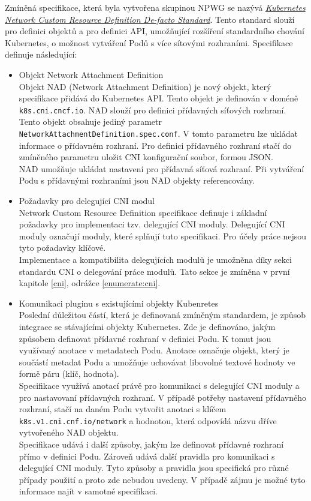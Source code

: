 Zmíněná specifikace, která byla vytvořena skupinou NPWG se nazývá \href{https://github.com/k8snetworkplumbingwg/multi-net-spec}{\textit{Kubernetes Network Custom Resource Definition De-facto Standard}}. Tento standard slouží pro definici objektů a pro definici API, umožňující rozšíření standardního chování Kubernetes, o možnost vytváření Podů s více sítovými rozhraními. Specifikace definuje následující:

\begin{itemize}
    \item Objekt Network Attachment Definition\\
    Objekt NAD (Network Attachment Definition) je nový objekt, který specifikace přidává do Kubernetes API. Tento objekt je definován v doméně \verb|k8s.cni.cncf.io|. NAD slouží pro definici přídavných síťových rozhraní. Tento objekt obsahuje jediný parametr\\\verb|NetworkAttachmentDefinition.spec.conf|. V tomto parametru lze ukládat informace o přídavném rozhraní. Pro definici přídavného rozhraní stačí do zmíněného parametru uložit CNI konfigurační soubor, formou JSON.\\
    NAD umožňuje ukládat nastavení pro přídavná síťová rozhraní. Při vytváření Podu s přídavnými rozhraními jsou NAD objekty referencovány.
    \item Požadavky pro delegující CNI modul\\
    Network Custom Resource Definition specifikace definuje i základní požadavky pro implementaci tzv. delegující CNI moduly. Delegující CNI moduly označují moduly, které splňují tuto specifikaci. Pro účely práce nejsou tyto požadavky klíčové.\\
    Implementace a kompatibilita delegujících modulů je umožněna díky sekci standardu CNI o delegování práce modulů. Tato sekce je zmíněna v první kapitole \ref{cni}, odrážce \ref{enumerate:cni}.   
    \item Komunikaci pluginu s existujícími objekty Kubenretes\\
    Poslední důležitou částí, která je definovaná zmíněným standardem, je způsob integrace se stávajícími objekty Kubernetes. Zde je definováno, jakým způsobem definovat přídavné rozhraní v definici Podu. K tomut jsou využívaný anotace v metadatech Podu. Anotace označuje objekt, který je součástí metadat Podu a umožňuje uchovávat libovolné textové hodnoty ve formě páru (klíč, hodnota).\\
    Specifikace využívá anotací právě pro komunikaci s delegující CNI moduly a pro nastavovaní přídavných rozhraní. V případě potřeby nastavení přídavného rozhraní, stačí na daném Podu vytvořit anotaci s klíčem \verb|k8s.v1.cni.cnf.io/network| a hodnotou, která odpovídá názvu dříve vytvořeného NAD objektu.\\
    Specifikace udává i další způsoby, jakým lze definovat přídavné rozhraní přímo v definici Podu. Zároveň udává další pravidla pro komunikaci s delegující CNI moduly. Tyto způsoby a pravidla jsou specifická pro různé případy použití a proto zde nebudou uvedeny. V případě zájmu je možné tyto informace najít v samotné specifikaci. 
\end{itemize}
